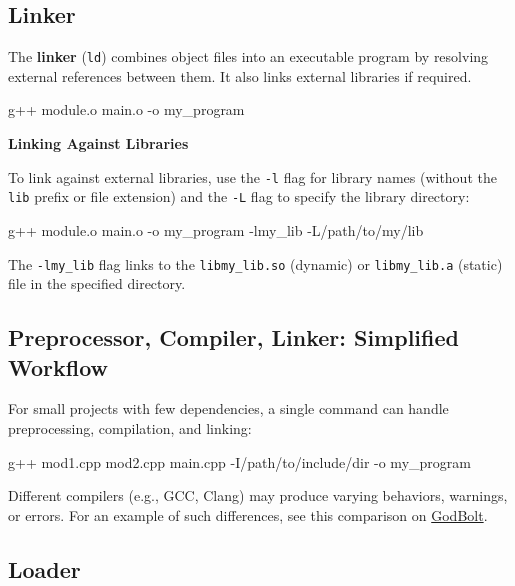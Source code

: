\subsection{Linker}

The \textbf{linker} (\texttt{ld}) combines object files into an executable program by resolving external references between them. It also links external libraries if required.

\begin{exampleblock}[Linker]
    \begin{codeblock}[language=bash, numbers=none]
g++ module.o main.o -o my_program
    \end{codeblock}
\end{exampleblock}

\textbf{Linking Against Libraries}

To link against external libraries, use the \texttt{-l} flag for library names (without the \texttt{lib} prefix or file extension) and the \texttt{-L} flag to specify the library directory:

\begin{codeblock}[language=bash, numbers=none]
g++ module.o main.o -o my_program -lmy_lib -L/path/to/my/lib
\end{codeblock}

The \texttt{-lmy\_lib} flag links to the \texttt{libmy\_lib.so} (dynamic) or \texttt{libmy\_lib.a} (static) file in the specified directory.

\subsection{Preprocessor, Compiler, Linker: Simplified Workflow}

For small projects with few dependencies, a single command can handle preprocessing, compilation, and linking:

\begin{codeblock}[language=bash, numbers=none]
g++ mod1.cpp mod2.cpp main.cpp -I/path/to/include/dir -o my_program
\end{codeblock}

\begin{warningblock}
Different compilers (e.g., GCC, Clang) may produce varying behaviors, warnings, or errors. For an example of such differences, see this comparison on \href{https://godbolt.org/z/1M83E4sYE}{GodBolt}.
\end{warningblock}

\subsection{Loader}

